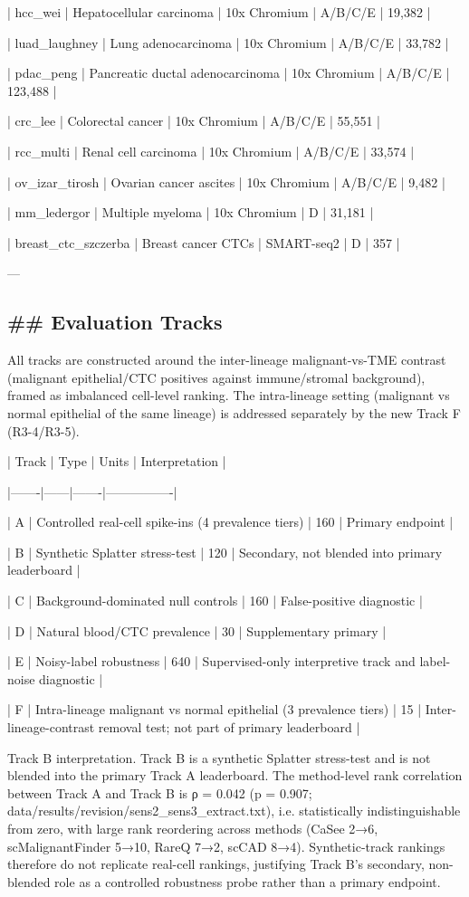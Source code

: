 \documentclass[11pt]{article}
\newcommand{\added}[1]{{\color{trackred}#1}}
\begin{document}
| hcc\_wei | Hepatocellular carcinoma | 10x Chromium | A/B/C/E | 19,382 |

| luad\_laughney | Lung adenocarcinoma | 10x Chromium | A/B/C/E | 33,782 |

| pdac\_peng | Pancreatic ductal adenocarcinoma | 10x Chromium | A/B/C/E | 123,488 |

| crc\_lee | Colorectal cancer | 10x Chromium | A/B/C/E | 55,551 |

| rcc\_multi | Renal cell carcinoma | 10x Chromium | A/B/C/E | 33,574 |

| ov\_izar\_tirosh | Ovarian cancer ascites | 10x Chromium | A/B/C/E | 9,482 |

| mm\_ledergor | Multiple myeloma | 10x Chromium | D | 31,181 |

| breast\_ctc\_szczerba | Breast cancer CTCs | SMART-seq2 | D | 357 |

---

\subsection*{\#\# Evaluation Tracks}
\added{All tracks are constructed around the inter-lineage malignant-vs-TME contrast (malignant epithelial/CTC positives against immune/stromal background), framed as imbalanced cell-level ranking. The intra-lineage setting (malignant vs normal epithelial of the same lineage) is addressed separately by the new Track F (R3-4/R3-5).}

| Track | Type | Units | Interpretation |

|-------|------|-------|----------------|

| A | Controlled real-cell spike-ins (4 prevalence tiers) | 160 | Primary endpoint |

| B | Synthetic Splatter stress-test | 120 | Secondary, not blended into primary leaderboard |

| C | Background-dominated null controls | 160 | False-positive diagnostic |

| D | Natural blood/CTC prevalence | 30 | Supplementary primary |

| E | Noisy-label robustness | 640 | Supervised-only interpretive track and label-noise diagnostic |

\added{| F | Intra-lineage malignant vs normal epithelial (3 prevalence tiers) | 15 | Inter-lineage-contrast removal test; not part of primary leaderboard |

Track B interpretation. Track B is a synthetic Splatter stress-test and is not blended into the primary Track A leaderboard. The method-level rank correlation between Track A and Track B is ρ = 0.042 (p = 0.907; data/results/revision/sens2\_sens3\_extract.txt), i.e. statistically indistinguishable from zero, with large rank reordering across methods (CaSee 2→6, scMalignantFinder 5→10, RareQ 7→2, scCAD 8→4). Synthetic-track rankings therefore do not replicate real-cell rankings, justifying Track B's secondary, non-blended role as a controlled robustness probe rather than a primary endpoint.}
\end{document}
